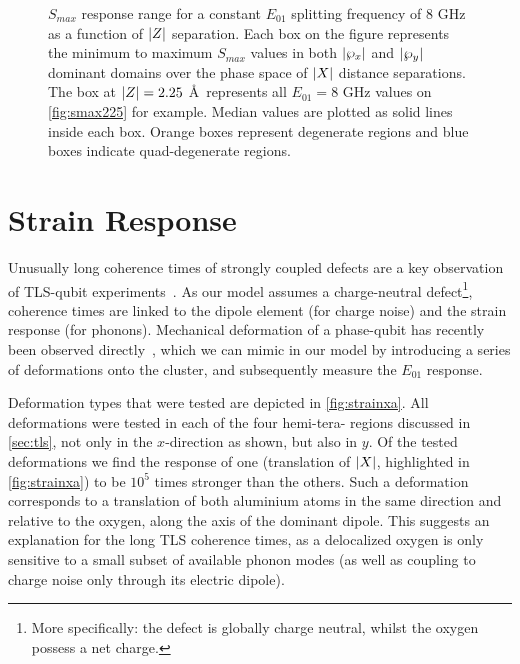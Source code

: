 \begin{figure}[htp]
\resizebox{\textwidth}{!}{}
\caption[$S_{max}$ Response Range]{\label{fig:smaxz}$S_{max}$ response range for a constant $E_{01}$ splitting frequency of $8$ GHz as a function of $\lvert Z\rvert$ separation. Each box on the figure represents the minimum to maximum $S_{max}$ values in both $\lvert\wp_{x}\rvert$ and $\lvert\wp_{y}\rvert$ dominant domains over the phase space of $\lvert X\rvert$ distance separations. The box at $\lvert Z\rvert = 2.25$ \AA\ represents all $E_{01} = 8$ GHz values on \cref{fig:smax225} for example. Median values are plotted as solid lines inside each box. Orange boxes represent degenerate regions and blue boxes indicate quad-degenerate regions.}
\end{figure}

\section{Strain Response}\label{sec:strain}

Unusually long coherence times of strongly coupled defects are a key observation of TLS-qubit experiments~\cite{Neeley2008, Lisenfeld2010a}.
As our model assumes a charge-neutral defect\footnote{More specifically: the defect is globally charge neutral, whilst the oxygen possess a net charge.}, coherence times are linked to the dipole element (for charge noise) and the strain response (for phonons).
Mechanical deformation of a phase-qubit has recently been observed directly~\cite{Grabovskij2012}, which we can mimic in our  model by introducing a series of deformations onto the cluster, and subsequently measure the $E_{01}$ response.

Deformation types that were tested are depicted in \cref{fig:strainxa}.
All deformations were tested in each of the four hemi-tera- regions discussed in \cref{sec:tls}, not only in the $x$-direction as shown, but also in $y$.
Of the tested deformations we find the response of one (translation of $\lvert X\rvert$, highlighted in \cref{fig:strainxa}) to be $10^5$ times stronger than the others.
Such a deformation corresponds to a translation of both aluminium atoms in the same direction and relative to the oxygen, along the axis of the dominant dipole.
This suggests an explanation for the long TLS coherence times, as a delocalized oxygen is only sensitive to a small subset of available phonon modes (as well as coupling to charge noise only through its electric dipole).

